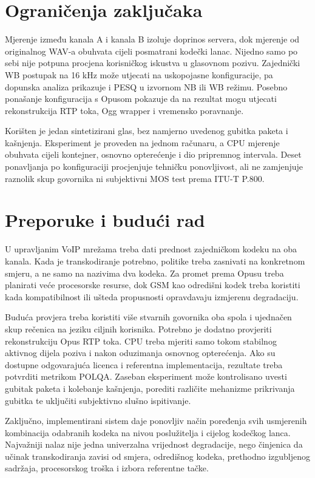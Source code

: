 \section{Ograničenja zaključaka}

Mjerenje između kanala A i kanala B izoluje doprinos servera, dok mjerenje od originalnog WAV-a obuhvata cijeli posmatrani kodečki lanac. Nijedno samo po sebi nije potpuna procjena korisničkog iskustva u glasovnom pozivu. Zajednički WB postupak na 16 kHz može utjecati na uskopojasne konfiguracije, pa dopunska analiza prikazuje i PESQ u izvornom NB ili WB režimu. Posebno ponašanje konfiguracija s Opusom pokazuje da na rezultat mogu utjecati rekonstrukcija RTP toka, Ogg wrapper i vremensko poravnanje.

Korišten je jedan sintetizirani glas, bez namjerno uvedenog gubitka paketa i kašnjenja. Eksperiment je proveden na jednom računaru, a CPU mjerenje obuhvata cijeli kontejner, osnovno opterećenje i dio pripremnog intervala. Deset ponavljanja po konfiguraciji procjenjuje tehničku ponovljivost, ali ne zamjenjuje raznolik skup govornika ni subjektivni MOS test prema ITU-T P.800.

\section{Preporuke i budući rad}

U upravljanim VoIP mrežama treba dati prednost zajedničkom kodeku na oba kanala. Kada je transkodiranje potrebno, politike treba zasnivati na konkretnom smjeru, a ne samo na nazivima dva kodeka. Za promet prema Opusu treba planirati veće procesorske resurse, dok GSM kao odredišni kodek treba koristiti kada kompatibilnost ili ušteda propusnosti opravdavaju izmjerenu degradaciju.

Buduća provjera treba koristiti više stvarnih govornika oba spola i ujednačen skup rečenica na jeziku ciljnih korisnika. Potrebno je dodatno provjeriti rekonstrukciju Opus RTP toka. CPU treba mjeriti samo tokom stabilnog aktivnog dijela poziva i nakon oduzimanja osnovnog opterećenja. Ako su dostupne odgovarajuća licenca i referentna implementacija, rezultate treba potvrditi metrikom POLQA. Zaseban eksperiment može kontrolisano uvesti gubitak paketa i kolebanje kašnjenja, porediti različite mehanizme prikrivanja gubitka te uključiti subjektivno slušno ispitivanje.

Zaključno, implementirani sistem daje ponovljiv način poređenja svih usmjerenih kombinacija odabranih kodeka na nivou poslužitelja i cijelog kodečkog lanca. Najvažniji nalaz nije jedna univerzalna vrijednost degradacije, nego činjenica da učinak transkodiranja zavisi od smjera, odredišnog kodeka, prethodno izgubljenog sadržaja, procesorskog troška i izbora referentne tačke.
